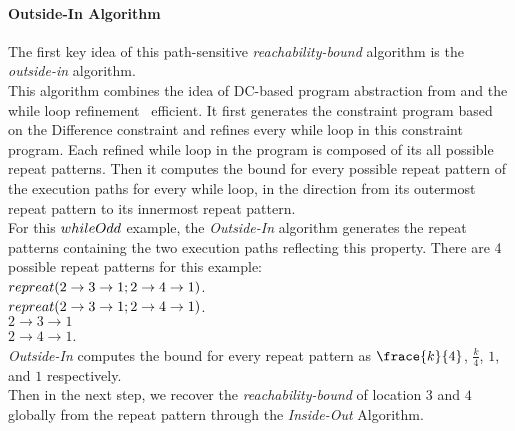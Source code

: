 \paragraph*{Outside-In Algorithm}
The first key idea of this path-sensitive \emph{reachability-bound} algorithm is the \emph{outside-in} algorithm.
\\
This algorithm combines the idea of DC-based program abstraction from \cite{sinn2017complexity}
and the while loop refinement~\cite{GulwaniJK09} efficient.
It first generates the constraint program based on the Difference constraint and refines every while loop in this constraint program.
Each refined while loop in the program is composed of its all possible repeat patterns.
Then it
computes the bound for every possible repeat pattern of the execution paths for every while loop,
in the direction
from its outermost repeat pattern to its innermost repeat pattern.
\\
For this ${{whileOdd}}$ example, the \emph{Outside-In} algorithm generates 
the repeat patterns containing the two execution paths reflecting this property.
There are 4 possible repeat patterns for this example:
\\
${{repreat}}(2 \to 3 \to 1; 2 \to 4 \to 1)$.
\\
${{repreat}}(2 \to 3 \to 1; 2 \to 4 \to 1)$.
\\
$2 \to 3 \to 1$
\\
$2 \to 4 \to 1$.
\\
\emph{Outside-In} computes the bound for every repeat pattern
as $\frace{k}{4}$, $\frac{k}{4}$, $1$, and $1$ respectively.
\\
Then in the next step, we recover the \emph{reachability-bound} of location $3$ and $4$ globally from the
repeat pattern through the \emph{Inside-Out} Algorithm.
